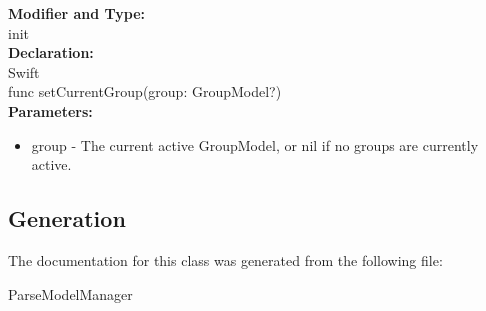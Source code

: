 \textbf{Modifier and Type:}\\
\tab init\\


\textbf{Declaration:}\\
\tab 
Swift\\

func setCurrentGroup(group: GroupModel?)\\

\textbf{Parameters:}
\begin{itemize}
\item group - The current active GroupModel, or nil if no groups are currently active.
\end{itemize}




\subsection{Generation}
The documentation for this class was generated from the following file\-:
\begin{DoxyCompactItemize}
\item ParseModelManager
\end{DoxyCompactItemize} 









